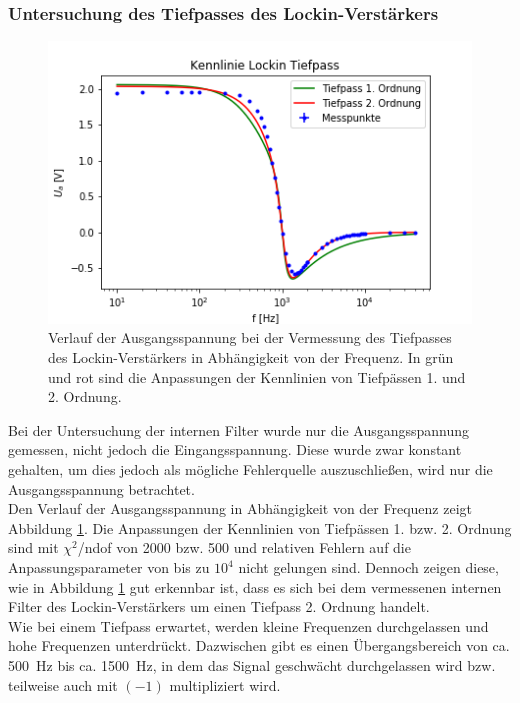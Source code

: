 \documentclass[12pt,a4paper]{article}
\begin{document}
\subsubsection{Untersuchung des Tiefpasses des Lockin-Verstärkers}

\begin{figure}
\centering
\includegraphics[scale=1]{Bilder/Vorversuch2/KennlinieTiefpass.png}
\caption[test]{Verlauf der Ausgangsspannung bei der Vermessung des Tiefpasses des Lockin-Verstärkers in Abhängigkeit von der Frequenz. In grün und rot sind die Anpassungen der Kennlinien von Tiefpässen 1. und 2. Ordnung.}
\label{fig:LockinTiefpass_Verlauf}
\end{figure}

Bei der Untersuchung der internen Filter wurde nur die Ausgangsspannung gemessen, nicht jedoch die Eingangsspannung. Diese wurde zwar konstant gehalten, um dies jedoch als mögliche Fehlerquelle auszuschließen, wird nur die Ausgangsspannung betrachtet. \\
Den Verlauf der Ausgangsspannung in Abhängigkeit von der Frequenz zeigt Abbildung \ref{fig:LockinTiefpass_Verlauf}. Die Anpassungen der Kennlinien von Tiefpässen 1. bzw. 2. Ordnung sind mit $\chi ^2$/ndof von 2000 bzw. 500 und relativen Fehlern auf die Anpassungsparameter von bis zu $10^4$ nicht gelungen sind. Dennoch zeigen diese, wie in Abbildung \ref{fig:LockinTiefpass_Verlauf} gut erkennbar ist, dass es sich bei dem vermessenen internen Filter des Lockin-Verstärkers um einen Tiefpass 2. Ordnung handelt. \\
Wie bei einem Tiefpass erwartet, werden kleine Frequenzen durchgelassen und hohe Frequenzen unterdrückt. Dazwischen gibt es einen Übergangsbereich von ca. \SI{500}{Hz} bis ca. \SI{1500}{Hz}, in dem das Signal geschwächt durchgelassen wird bzw. teilweise auch mit $(-1)$ multipliziert wird.
\end{document}
